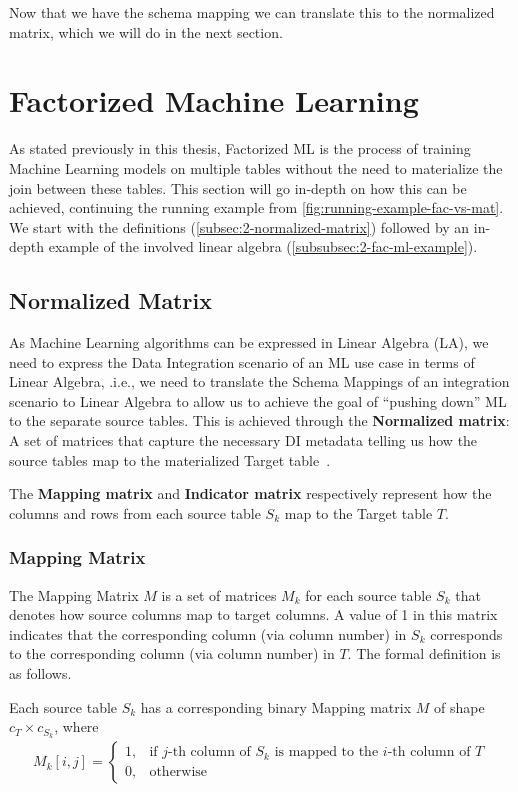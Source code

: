 Now that we have the schema mapping we can translate this to the normalized matrix, which we will do in the next section.

\section{Factorized Machine Learning}
\label{sec:2-factorized-ml}
As stated previously in this thesis, Factorized ML is the process of training Machine Learning models on multiple tables without the need to materialize the join between these tables. This section will go in-depth on how this can be achieved, continuing the running example from \autoref{fig:running-example-fac-vs-mat}.  We start with the definitions (\autoref{subsec:2-normalized-matrix}) followed by an in-depth example of the involved linear algebra (\autoref{subsubsec:2-fac-ml-example}).

\subsection{Normalized Matrix}
\label{subsec:2-normalized-matrix}
As Machine Learning algorithms can be expressed in Linear Algebra (LA), we need to express the Data Integration scenario of an ML use case in terms of Linear Algebra, .i.e., we need to translate the Schema Mappings of an integration scenario to Linear Algebra to allow us to achieve the goal of “pushing down” ML to the separate source tables. This is achieved through the \textbf{Normalized matrix}: A set of matrices that capture the necessary DI metadata telling us how the source tables map to the materialized Target table~\cite{amalur, morpheus}.

The \textbf{Mapping matrix} and \textbf{Indicator matrix} respectively represent how the columns and rows from each source table $S_k$ map to the Target table $T$.

\subsubsection{Mapping Matrix}
The Mapping Matrix $M$ is a set of matrices $M_k$ for each source table $S_k$ that denotes how source columns map to target columns. A value of 1 in this matrix indicates that the corresponding column (via column number) in $S_k$ corresponds to the corresponding column (via column number) in $T$. The formal definition is as follows.

\begin{definition}
  Each source table $S_k$ has a corresponding binary Mapping matrix $M$ of shape $c_T \times c_{S_k}$, where
  \begin{align*}
    M_k[i,j] = \begin{cases}
                 1, & \text{if $j$-th column of $S_k$ is mapped to the $i$-th column of $T$} \\
                 0, & \text{otherwise}
               \end{cases}
  \end{align*}
\end{definition}

